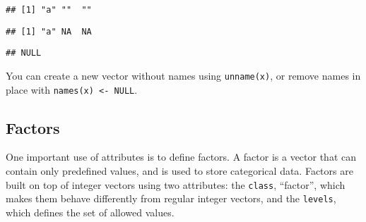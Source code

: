 \begin{Shaded}
\begin{Highlighting}[]
\StringTok{ }\NormalTok{(} \NormalTok{, }\NormalTok{, }\NormalTok{)}
\end{Highlighting}
\end{Shaded}

\begin{verbatim}
## [1] "a" ""  ""
\end{verbatim}

\begin{Shaded}
\begin{Highlighting}[]
\StringTok{ }\NormalTok{(}\NormalTok{, }\NormalTok{, }\NormalTok{)}
\StringTok{ }\NormalTok{(}\NormalTok{)}
\end{Highlighting}
\end{Shaded}

\begin{verbatim}
## [1] "a" NA  NA
\end{verbatim}

\begin{Shaded}
\begin{Highlighting}[]
\StringTok{ }\NormalTok{(}\NormalTok{, }\NormalTok{, }\NormalTok{)}
\end{Highlighting}
\end{Shaded}

\begin{verbatim}
## NULL
\end{verbatim}

You can create a new vector without names using \texttt{unname(x)}, or
remove names in place with \texttt{names(x)\ \textless{}-\ NULL}.

\hypertarget{factors}{%
\subsection{Factors}\label{factors}}

One important use of attributes is to define factors. A factor is a
vector that can contain only predefined values, and is used to store
categorical data. Factors are built on top of integer vectors using two
attributes: the \texttt{class}, ``factor'', which makes them behave
differently from regular integer vectors, and the \texttt{levels}, which
defines the set of allowed values. 

